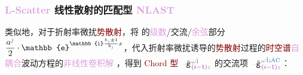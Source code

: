 \subsubsection{\textcolor{Plum}{L-Scatter} 线性散射的匹配型 \textcolor{Plum}{NLAST}}\label{sssec:NLAST_match-holo_L}

类似地，对于\textcolor{PineGreen}{折射率}\textcolor{NavyBlue}{微扰}\textcolor{Maroon}{势散射}，将  的\textcolor{Plum}{级数}/\textcolor{NavyBlue}{交流}/\textcolor{Plum}{余弦}部分 $\dfrac{a^{\textcolor{NavyBlue}{j}}}{2} \cdot \mathbb{e}^{\mathbb{i} {\frac{b_{\textcolor{NavyBlue}{j}} \pm 1}{b_{\textcolor{NavyBlue}{j}}}} x}$，代入\textcolor{PineGreen}{折射率}\textcolor{NavyBlue}{微扰}诱导的\textcolor{Maroon}{势散射}过程的\textcolor{Maroon}{时空谱}\textcolor{Plum}{自耦合}波动方程的\textcolor{Plum}{非线性卷积解} ，得到 \textcolor{Maroon}{Chord 型} $\xint{\begin{smallmatrix} ~ \\ {}^{}_{\mathcolor{gray}{-}} \\ ~ \end{smallmatrix}}{09}{\tilde{\mathtt{g}}}^{\;\!\mathcolor{gray}{\omega} \textcolor{PineGreen}{\hat{1}}}_{\;\! \textcolor{Plum}{(i-1)} \mathcolor{gray}{z}}$ 的\textcolor{NavyBlue}{交流项} $\xint{\begin{smallmatrix} ~ \\ {}^{}_{\mathcolor{gray}{-}} \\ ~ \end{smallmatrix}}{09}{\tilde{\mathtt{g}}}^{\;\!\mathcolor{gray}{\omega} \textcolor{PineGreen}{\hat{1}} ;\text{\textcolor{NavyBlue}{AC}} }_{\;\! \textcolor{Plum}{(i-1)} \mathcolor{gray}{z}}$：
